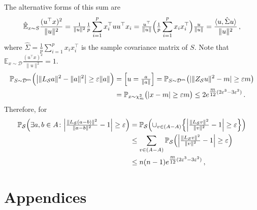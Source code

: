 \documentclass[a4paper,10pt]{article}
\begin{document}
\bigskip\noindent
The alternative forms of this sum are
$$
  \hat{\mathbb{E}}_{x\sim S} \frac{(u^\top x)^2}{\|u\|^2}
    = \tfrac1{\|u\|^2} \tfrac1p \sum_{i=1}^p x_i^\top u u^\top x_i
    = \tfrac{u^\top}{\|u\|}
      \Bigl( \tfrac1p \sum_{i=1}^p x_i x_i^\top \Bigr)
      \tfrac{u}{\|u\|} 
    = \frac{\langle u, \hat{\Sigma} u \rangle}{\|u\|^2}
    \,, $$
where $\hat{\Sigma} = \tfrac1p \sum_{i=1}^p x_i x_i^\top$ is the sample covariance
matrix of $S$. Note that $\mathbb{E}_{x\sim \mathcal{D}} \frac{(u^\top x)^2}{\|u\|^2} = 1$.
\begin{align*}
  \mathbb{P}_{S \sim \mathcal{D}^m} \Bigl(
    \bigl\lvert \| L_\mathcal{S} a \|^2 - \|a\|^2 \bigr \rvert
      \geq \varepsilon \|a\|
  \Bigr)
    &= \Bigl[u = \tfrac{a}{\|a\|}\Bigr]
    = \mathbb{P}_{S \sim \mathcal{D}^m} \bigl(
        \lvert \|Z_\mathcal{S} u\|^2 - m \rvert \geq \varepsilon m
      \bigr)
    \\
    &= \mathbb{P}_{x \sim \chi^2_m} \bigl(
        \lvert x - m \rvert \geq \varepsilon m
      \bigr)
      \leq 2 e^{\tfrac{m}{12} (2 \varepsilon^3 - 3 \varepsilon^2)}
    \,.
\end{align*}
Therefore, for
\begin{align*}
  \mathbb{P}_\mathcal{S}\Bigl(
    \exists{a, b\in A} \colon
    \Bigl\lvert \tfrac{\| L_\mathcal{S} (a - b) \|^2}{\|a - b\|^2} - 1 \Bigr\rvert
      \geq \varepsilon
  \Bigr)
    &= \mathbb{P}_\mathcal{S}\Bigl(
      \cup_{v\in (A - A)} \Bigl\{
        \Bigl\lvert \tfrac{\| L_\mathcal{S} v \|^2}{\|v\|^2} - 1 \Bigr\rvert
          \geq \varepsilon
      \Bigr\}
    \Bigr)
    \\
    &\leq \sum_{v\in (A - A)}
      \mathbb{P}_\mathcal{S}\Bigl(
        \Bigl\lvert \tfrac{\| L_\mathcal{S} v \|^2}{\|v\|^2} - 1 \Bigr\rvert
          \geq \varepsilon
      \Bigr)
    \\
    &\leq n (n - 1) e^{\tfrac{m}{12} (2 \varepsilon^3 - 3 \varepsilon^2)}
    \,,
\end{align*}



\section*{Appendices} %
\label{sec:appendices}
\end{document}
